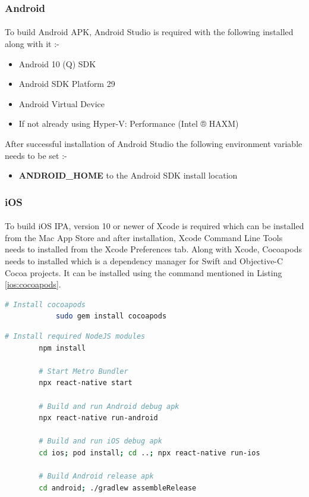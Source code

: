 \documentclass{article}
\begin{document}
        \subsubsection{Android}
            \paragraph{}
            To build Android APK, Android Studio is required with the following installed along with it :- 
            \begin{itemize}
                \item Android 10 (Q) SDK
                \item Android SDK Platform 29
                \item Android Virtual Device
                \item If not already using Hyper-V: Performance (Intel ® HAXM)
            \end{itemize}
            After successful installation of Android Studio the following environment variable needs to be set :-
            \begin{itemize}
                \item \textbf{ANDROID\_HOME} to the Android SDK install location
            \end{itemize}
        
        \subsubsection{iOS}
            \paragraph{}
            To build iOS IPA, version 10 or newer of Xcode is required which can be installed from the Mac App Store and after installation, Xcode Command Line Tools needs to installed from the Xcode Preferences tab. Along with Xcode, Cocoapods needs to installed which is a dependency manager for Swift and Objective-C Cocoa projects. It can be installed using the command mentioned in Listing \ref{ios:cocoapods}.
        
            \begin{lstlisting}[language=bash, caption=Cocoapods installation, label=ios:cocoapods]
            # Install cocoapods
            sudo gem install cocoapods    
            \end{lstlisting}
        
        \begin{lstlisting}[language=bash, caption=Smartphone Application]
        # Install required NodeJS modules
        npm install
    
        # Start Metro Bundler
        npx react-native start
    
        # Build and run Android debug apk
        npx react-native run-android
        
        # Build and run iOS debug apk
        cd ios; pod install; cd ..; npx react-native run-ios
        
        # Build Android release apk
        cd android; ./gradlew assembleRelease
        \end{lstlisting}
        
\end{document}
